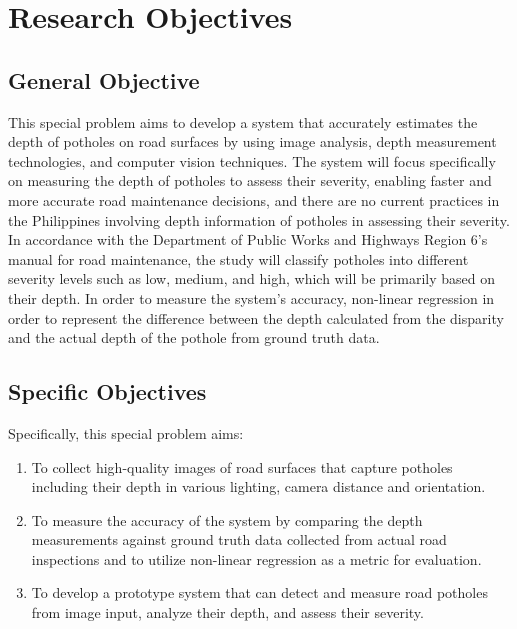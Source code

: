 \section{Research Objectives}
\label{sec:researchobjectives}

\subsection{General Objective}
\label{sec:generalobjective}

This special problem aims to develop a system that accurately estimates the depth of potholes on road surfaces by using image analysis, depth measurement technologies, and computer vision techniques. The system will focus specifically on measuring the depth of potholes to assess their severity, enabling faster and more accurate road maintenance decisions, and there are no current practices in the Philippines involving depth information of potholes in assessing their severity. In accordance with the Department of Public Works and Highways Region 6’s manual for road maintenance, the study will classify potholes into different severity levels such as low, medium, and high, which will be primarily based on their depth. In order to measure the system's accuracy, non-linear regression in order to represent the difference between the depth calculated from the disparity and the actual depth of the pothole from ground truth data.

\subsection{Specific Objectives}
\label{sec:specificobjectives}

Specifically, this special problem aims:
\begin{enumerate}
	\item To collect high-quality images of road surfaces that capture potholes including their depth in various lighting, camera distance and orientation.
	\item To measure the accuracy of the system by comparing the depth measurements against ground truth data collected from actual road inspections and to utilize non-linear regression as a metric for evaluation.
	\item To develop a prototype system that can detect and measure road potholes from image input, analyze their depth, and assess their severity.
\end{enumerate}


